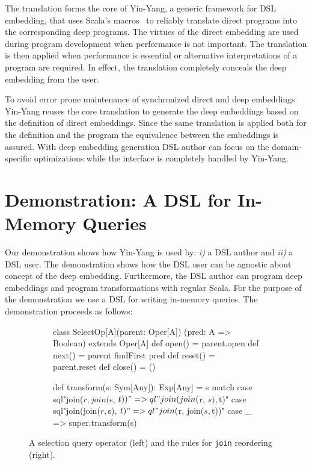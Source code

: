 \documentclass{llncs}
\newcommand{\scode}[1]{\lstinline[language=Scala,columns=fixed,basicstyle=\ttfamily,keywordstyle=\ttfamily]|#1|}
\newcommand{\code}[1]{\scode{#1}}
\newcommand{\tool}{Yin-Yang\xspace}
\begin{document}
The translation forms the core of \tool, a generic framework for DSL
embedding, that uses Scala's macros~\cite{burmako_scala_2013} to reliably
translate direct \edsl{} programs into the corresponding deep \edsl programs.
The virtues of the direct embedding are used during program development when
performance is not important. The translation is then applied when performance
is essential or alternative interpretations of a program are required. In
effect, the translation completely conceals the deep embedding from the user.

To avoid error prone maintenance of synchronized direct and deep embeddings
\tool reuses the core translation to generate the deep embeddings based on the
definition of direct embeddings. Since the same translation is applied both
for the \edsl definition and the \edsl program the equivalence between the
embeddings is assured. With deep embedding generation DSL author can focus on
the domain-specific optimizations while the interface is completely handled by
\tool.


\section{Demonstration: A DSL for In-Memory Queries}

  

  Our demonstration shows how \tool is used by: \emph{i)} a DSL author and \emph{ii)} a DSL user. The demonstration shows how the DSL user can be agnostic about concept of the deep embedding. Furthermore, the DSL author can program deep embeddings and program transformations with regular Scala. For the purpose of the demonstration we use a DSL for writing in-memory queries. The demonstration proceeds as follows: 

\lstset{mathescape=false}
\begin{figure*}[ht]
\begin{multicols}{2}
\begin{subfigure}[b]{1\linewidth}
\centering

\begin{listingtiny}
class SelectOp[A](parent: Oper[A])
  (pred: A => Boolean) extends Oper[A]{
  def open() = parent.open
  def next() = parent findFirst pred    
  def reset() = parent.reset
  def close() = ()
}
\end{listingtiny}
\label{lst:shallow}
\end{subfigure}

\begin{subfigure}[b]{1\linewidth}
\begin{listingtiny}
def transform(s: Sym[Any]): Exp[Any] = s match {
  case sql"join($r, join($s, $t))" => 
    ql"join(join($r, $s), $t)"
  case sql"join(join($r, $s), $t)" => 
    ql"join($r, join($s, $t))"
  case _ => super.transform(s)
}
\end{listingtiny}

\end{subfigure}
\end{multicols}
\caption{\label{lst:select} A selection query operator (left) and the rules for \code{join} reordering (right).}
\end{figure*}
\end{document}
